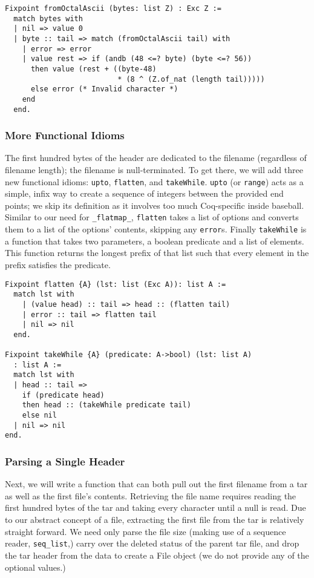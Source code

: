 \documentclass[nocopyrightspace]{sigplanconf}
\begin{document}
\begin{lstlisting}
Fixpoint fromOctalAscii (bytes: list Z) : Exc Z :=
  match bytes with
  | nil => value 0
  | byte :: tail => match (fromOctalAscii tail) with
    | error => error
    | value rest => if (andb (48 <=? byte) (byte <=? 56))
      then value (rest + ((byte-48)
                          * (8 ^ (Z.of_nat (length tail)))))
      else error (* Invalid character *)
    end
  end.
\end{lstlisting}

\subsubsection{More Functional Idioms}

The first hundred bytes of the header are dedicated to the filename
(regardless of filename length); the filename is null-terminated. To get
there, we will add three new functional idioms: {\tt upto}, {\tt flatten}, and
{\tt takeWhile}. {\tt upto} (or {\tt range}) acts as a simple, infix way to
create a sequence of integers between the provided end points; we skip its
definition as it involves too much Coq-specific inside baseball. Similar to
our need for {\tt \_flatmap\_}, {\tt flatten} takes a list of options and
converts them to a list of the options' contents, skipping any {\tt error}s.
Finally {\tt takeWhile} is a function that takes two parameters, a boolean
predicate and a list of elements. This function returns the longest prefix of
that list such that every element in the prefix satisfies the predicate.

\begin{lstlisting}
Fixpoint flatten {A} (lst: list (Exc A)): list A :=
  match lst with
    | (value head) :: tail => head :: (flatten tail)
    | error :: tail => flatten tail
    | nil => nil
  end.

Fixpoint takeWhile {A} (predicate: A->bool) (lst: list A)
  : list A :=
  match lst with
  | head :: tail => 
    if (predicate head) 
    then head :: (takeWhile predicate tail)
    else nil
  | nil => nil
end.
\end{lstlisting}

\subsubsection{Parsing a Single Header}
Next, we will write a function that can both pull out the first filename from
a tar as well as the first file's contents. Retrieving the file name requires
reading the first hundred bytes of the tar and taking every character until a
null is read. Due to our abstract concept of a file, extracting the first file
from the tar is relatively straight forward. We need only parse the file size
(making use of a sequence reader, {\tt seq\_list},) carry over the deleted
status of the parent tar file, and drop the tar header from the data to create
a File object (we do not provide any of the optional values.)
\end{document}
